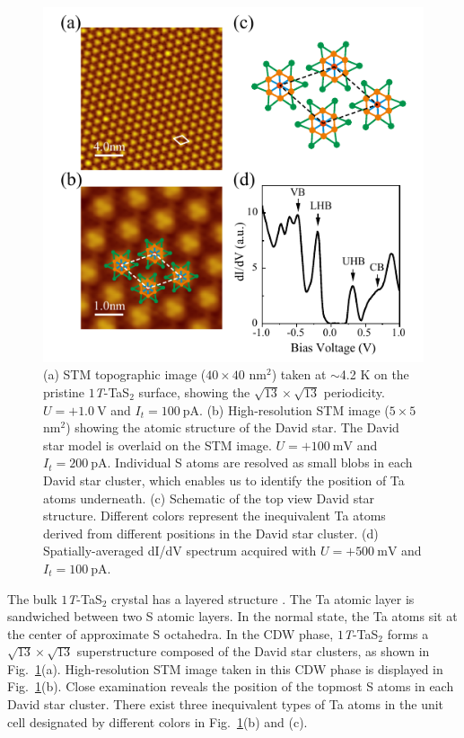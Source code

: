 \documentclass[aps,prl,reprint,groupedaddress,showpacs,amsfonts,amsmath,amssymb,superscriptaddress]{revtex4-1}
\begin{document}
\begin{figure}
  \centering
  \includegraphics[scale=1.0]{fig/fig1.pdf}
  \caption{\label{david-star}(a) STM topographic image ($40 \times40$ $\mathrm{nm}^{2}$) taken at $\sim$4.2 K on the pristine $1$\emph{T}-TaS$_{2}$ surface, showing the $\sqrt{13}\times\sqrt{13}$ periodicity. $U=+1.0~\mathrm{V}$ and $I_{t}=100~\mathrm{pA}$. (b) High-resolution STM image ($5 \times5$ $\mathrm{nm}^{2}$) showing the atomic structure of the David star. The David star model is overlaid on the STM image. $U=+100~\mathrm{mV}$ and $I_{t}=200~\mathrm{pA}$. Individual S atoms are resolved as small blobs in each David star cluster, which enables us to identify the position of Ta atoms underneath. (c) Schematic of the top view David star structure. Different colors represent the inequivalent Ta atoms derived from different positions in the David star cluster. (d) Spatially-averaged dI/dV spectrum acquired with $U=+500~\mathrm{mV}$ and $I_{t}=100~\mathrm{pA}$.}
\end{figure}
The bulk $1$\emph{T}-TaS$_{2}$ crystal has a layered structure \cite{AdvPhys.18.193}. The Ta atomic layer is sandwiched between two S atomic layers. In the normal state, the Ta atoms sit at the center of approximate S octahedra. In the CDW phase, $1$\emph{T}-TaS$_{2}$ forms a $\sqrt{13}\times\sqrt{13}$ superstructure composed of the David star clusters, as shown in Fig.~\ref{david-star}(a). High-resolution STM image taken in this CDW phase is displayed in Fig.~\ref{david-star}(b). Close examination reveals the position of the topmost S atoms in each David star cluster. There exist three inequivalent types of Ta atoms in the unit cell designated by different colors in Fig.~\ref{david-star}(b) and (c).
\end{document}

